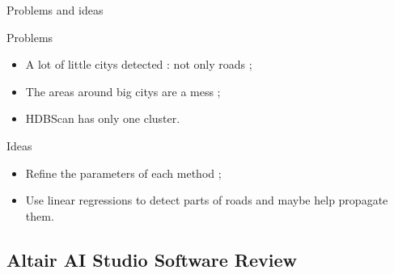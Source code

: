 \begin{frame}{Problems and ideas}
    \begin{block}{Problems}
        \begin{itemize}
            \item A lot of little citys detected : not only roads ;
            \item The areas around big citys are a mess ;
            \item HDBScan has only one cluster.
        \end{itemize}
    \end{block}

    \begin{block}{Ideas}
        \begin{itemize}
            \item Refine the parameters of each method ;
            \item Use linear regressions to detect parts of roads and maybe help propagate them.
        \end{itemize}
    \end{block}
\end{frame}

\subsection{Altair AI Studio Software Review}
\insertsubsectionframe

